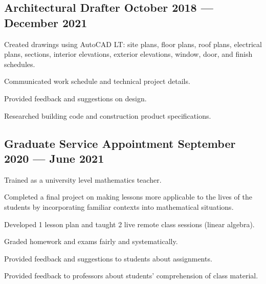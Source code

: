 \documentclass[letter,10pt]{article}
\begin{document}
\subsection{{Architectural Drafter \hfill October 2018 --- December 2021}}
\begin{zitemize}
    \item Created drawings using AutoCAD LT: site plans, floor plans, roof plans, electrical plans, sections, interior elevations, exterior elevations, window, door, and finish schedules.
    \item Communicated work schedule and technical project details.
    \item Provided feedback and suggestions on design.
    \item Researched building code and construction product specifications.
\end{zitemize}

\subsection{{Graduate Service Appointment \hfill September 2020 --- June 2021}}
\begin{zitemize}
    \item Trained as a university level mathematics teacher.
    \item Completed a final project on making lessons more applicable to the lives of the students by incorporating familiar contexts into mathematical situations.
    \item Developed 1 lesson plan and taught 2 live remote class sessions (linear algebra).
    \item Graded homework and exams fairly and systematically.
    \item Provided feedback and suggestions to students about assignments.
    \item Provided feedback to professors about students' comprehension of class material.
\end{zitemize}
\end{document}
